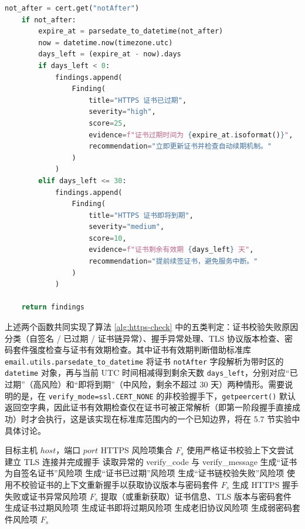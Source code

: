 \documentclass[12pt,a4paper,fontset=none]{ctexart}
\begin{document}
\begin{lstlisting}[language=Python,caption={HTTPS 风险检测逻辑}]
    not_after = cert.get("notAfter")
    if not_after:
        expire_at = parsedate_to_datetime(not_after)
        now = datetime.now(timezone.utc)
        days_left = (expire_at - now).days
        if days_left < 0:
            findings.append(
                Finding(
                    title="HTTPS 证书已过期",
                    severity="high",
                    score=25,
                    evidence=f"证书过期时间为 {expire_at.isoformat()}",
                    recommendation="立即更新证书并检查自动续期机制。"
                )
            )
        elif days_left <= 30:
            findings.append(
                Finding(
                    title="HTTPS 证书即将到期",
                    severity="medium",
                    score=10,
                    evidence=f"证书剩余有效期 {days_left} 天",
                    recommendation="提前续签证书，避免服务中断。"
                )
            )

    return findings
\end{lstlisting}

上述两个函数共同实现了算法 \ref{alg:https-check} 中的五类判定：证书校验失败原因分类（自签名 / 已过期 / 证书链异常）、握手异常处理、TLS 协议版本检查、密码套件强度检查与证书有效期检查。其中证书有效期判断借助标准库 \texttt{email.utils.parsedate\_to\_datetime} 将证书 \texttt{notAfter} 字段解析为带时区的 \texttt{datetime} 对象，再与当前 UTC 时间相减得到剩余天数 \texttt{days\_left}，分别对应“已过期”（高风险）和“即将到期”（中风险，剩余不超过 30 天）两种情形。需要说明的是，在 \texttt{verify\_mode=ssl.CERT\_NONE} 的非校验握手下，\texttt{getpeercert()} 默认返回空字典，因此证书有效期检查仅在证书可被正常解析（即第一阶段握手直接成功）时才会执行，这是该实现在标准库范围内的一个已知边界，将在 5.7 节实验中具体讨论。

\begin{algorithm}[H]
\caption{HTTPS 风险检测算法}
\label{alg:https-check}
\begin{algorithmic}[1]
\Require 目标主机 $host$，端口 $port$
\Ensure HTTPS 风险项集合 $F_s$
\State 使用严格证书校验上下文尝试建立 TLS 连接并完成握手
  \State 读取异常的 verify\_code 与 verify\_message
    \State 生成“证书为自签名证书”风险项
    \State 生成“证书已过期”风险项
  \Else
    \State 生成“证书链校验失败”风险项
  \EndIf
  \State 使用不校验证书的上下文重新握手以获取协议版本与密码套件
    \State \Return $F_s$
  \EndIf
{}
  \State 生成 HTTPS 握手失败或证书异常风险项
  \State \Return $F_s$
\EndIf
\State 提取（或重新获取）证书信息、TLS 版本与密码套件
  \State 生成证书过期风险项
  \State 生成证书即将过期风险项
\EndIf
{}
  \State 生成老旧协议风险项
\EndIf
{}
  \State 生成弱密码套件风险项
\EndIf
\State \Return $F_s$
\end{algorithmic}
\end{algorithm}
\end{document}
